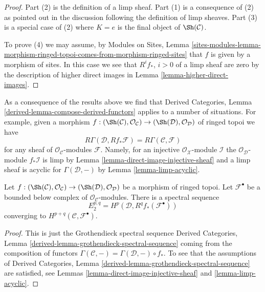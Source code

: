 \begin{proof}
Part (2) is the definition of a limp sheaf.
Part (1) is a consequence of (2) as pointed out in the discussion following the
definition of limp sheaves.
Part (3) is a special case of (2) where $K = e$ is the final object
of $\Sh(\mathcal{C})$.

\medskip\noindent
To prove (4) we may assume, by
Modules on Sites, Lemma
\ref{sites-modules-lemma-morphism-ringed-topoi-comes-from-morphism-ringed-sites}
that $f$ is given by a morphism of sites. In this case we see that
$R^if_*$, $i > 0$ of a limp sheaf are zero by the description of
higher direct images in
Lemma \ref{lemma-higher-direct-images}.
\end{proof}

\begin{remark}
\label{remark-before-Leray}
As a consequence of the results above we find that
Derived Categories, Lemma \ref{derived-lemma-compose-derived-functors}
applies to a number of situations. For example, given a
morphism $f : (\Sh(\mathcal{C}), \mathcal{O}_\mathcal{C}) \to
(\Sh(\mathcal{D}), \mathcal{O}_\mathcal{D})$ of ringed topoi we have
$$
R\Gamma(\mathcal{D}, Rf_*\mathcal{F}) = R\Gamma(\mathcal{C}, \mathcal{F})
$$
for any sheaf of $\mathcal{O}_\mathcal{C}$-modules $\mathcal{F}$.
Namely, for an injective $\mathcal{O}_\mathcal{X}$-module $\mathcal{I}$
the $\mathcal{O}_\mathcal{D}$-module $f_*\mathcal{I}$ is limp by
Lemma \ref{lemma-direct-image-injective-sheaf}
and a limp sheaf is acyclic for $\Gamma(\mathcal{D}, -)$ by
Lemma \ref{lemma-limp-acyclic}.
\end{remark}

\begin{lemma}
\label{lemma-Leray}
Let $f : (\Sh(\mathcal{C}), \mathcal{O}_\mathcal{C}) \to
(\Sh(\mathcal{D}), \mathcal{O}_\mathcal{D})$ be a morphism of ringed topoi.
Let $\mathcal{F}^\bullet$ be a bounded below complex of
$\mathcal{O}_\mathcal{C}$-modules. There is a spectral sequence
$$
E_2^{p, q} = H^p(\mathcal{D}, R^qf_*(\mathcal{F}^\bullet))
$$
converging to $H^{p + q}(\mathcal{C}, \mathcal{F}^\bullet)$.
\end{lemma}

\begin{proof}
This is just the Grothendieck spectral sequence
Derived Categories, Lemma \ref{derived-lemma-grothendieck-spectral-sequence}
coming from the composition of functors
$\Gamma(\mathcal{C}, -) = \Gamma(\mathcal{D}, -) \circ f_*$.
To see that the assumptions of
Derived Categories, Lemma \ref{derived-lemma-grothendieck-spectral-sequence}
are satisfied, see
Lemmas \ref{lemma-direct-image-injective-sheaf} and
\ref{lemma-limp-acyclic}.
\end{proof}


